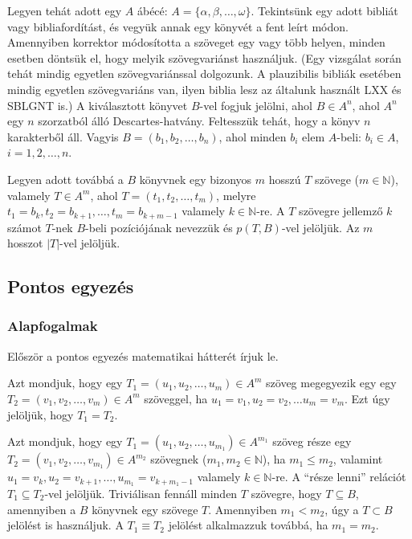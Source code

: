 \documentclass{article}
\begin{document}
Legyen tehát adott egy $A$ ábécé: $A=\{\alpha,\beta,\ldots,\omega\}$. Tekintsünk egy adott bibliát
vagy bibliafordítást, és vegyük annak egy könyvét a fent leírt módon. Amennyiben korrektor módosította
a szöveget egy vagy több helyen, minden esetben döntsük el, hogy melyik szövegvariánst használjuk.
(Egy vizsgálat során tehát mindig egyetlen szövegvariánssal dolgozunk. A plauzibilis bibliák esetében
mindig egyetlen szövegvariáns van, ilyen biblia lesz az általunk használt LXX és SBLGNT is.)
A kiválasztott könyvet $B$-vel fogjuk jelölni,
ahol $B\in A^n$, ahol $A^n$ egy $n$ szorzatból álló Descartes-hatvány. Feltesszük tehát, hogy a könyv
$n$ karakterből áll. Vagyis $B=(b_1,b_2,\ldots,b_n)$, ahol minden $b_i$ elem $A$-beli:
$b_i\in A$, $i=1,2,\ldots,n$.

Legyen adott továbbá a $B$ könyvnek egy bizonyos $m$ hosszú $T$ szövege ($m\in\mathbb{N}$), valamely $T\in A^m$, ahol
$T=(t_1,t_2,\ldots,t_m)$, melyre $t_1=b_k,t_2=b_{k+1},\ldots,t_m=b_{k+m-1}$ valamely $k\in\mathbb{N}$-re. A
$T$ szövegre jellemző $k$ számot $T$-nek $B$-beli pozíciójának nevezzük és $p(T,B)$-vel jelöljük.
Az $m$ hosszot $|T|$-vel jelöljük.

\subsection{Pontos egyezés}

\subsubsection{Alapfogalmak}

Először a pontos egyezés matematikai hátterét írjuk le.

Azt mondjuk, hogy egy $T_1=(u_1,u_2,\ldots,u_m)\in A^{m}$ szöveg megegyezik egy
egy $T_2=(v_1,v_2,\ldots,v_m)\in A^{m}$ szöveggel, ha $u_1=v_1, u_2=v_2, \ldots u_m=v_m$.
Ezt úgy jelöljük, hogy $T_1=T_2$.

Azt mondjuk, hogy egy $T_1=(u_1,u_2,\ldots,u_{m_1})\in A^{m_1}$ szöveg része
egy $T_2=(v_1,v_2,\ldots,v_{m_1})\in A^{m_2}$ szövegnek ($m_1,m_2\in\mathbb{N}$),
ha $m_1\leq m_2$, valamint $u_1=v_{k},u_2=v_{k+1},\ldots,u_{m_1}=v_{k+m_1-1}$ valamely $k\in\mathbb{N}$-re.
A ``része lenni'' relációt $T_1\subseteq T_2$-vel jelöljük. Triviálisan fennáll minden
$T$ szövegre, hogy $T\subseteq B$, amennyiben a $B$ könyvnek egy szövege $T$.
Amennyiben $m_1<m_2$, úgy a $T\subset B$ jelölést is használjuk.
A $T_1\equiv T_2$ jelölést alkalmazzuk továbbá, ha $m_1=m_2$.
\end{document}
